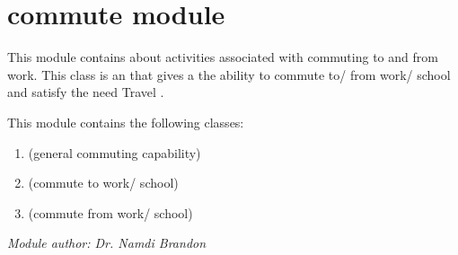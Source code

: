 \documentclass[letterpaper,10pt,english]{sphinxmanual}
\begin{document}
\section{commute module}
\label{commute::doc}\label{commute:module-commute}\label{commute:commute-module}
This module contains about activities associated with commuting to and from work. This class is an {\hyperref[activity:activity.Activity]{\emph{}}} that gives a {\hyperref[person:person.Person]{\emph{}}} the ability to commute to/ from work/ school and satisfy the need Travel {\hyperref[travel:travel.Travel]{\emph{}}}.

This module contains the following classes:
\begin{enumerate}
\item {} 
{\hyperref[commute:commute.Commute]{\emph{}}} (general commuting capability)

\item {} 
{\hyperref[commute:commute.Commute_To_Work]{\emph{}}} (commute to work/ school)

\item {} 
{\hyperref[commute:commute.Commute_From_Work]{\emph{}}} (commute from work/ school)

\end{enumerate}

\emph{Module author: Dr. Namdi Brandon}
\end{document}
